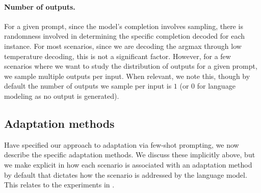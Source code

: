 \paragraph{Number of outputs.}
For a given prompt, since the model's completion involves sampling, there is randomness involved in determining the specific completion decoded for each instance. 
For most scenarios, since we are decoding the argmax through low temperature decoding, this is not a significant factor.
However, for a few scenarios where we want to study the distribution of outputs for a given prompt, we sample multiple outputs per input.
When relevant, we note this, though by default the number of outputs we sample per input is $1$ (or $0$ for language modeling as no output is generated).

\subsection{Adaptation methods}
\label{app:adaptation-methods}
Have specified our approach to adaptation via few-shot prompting, we now describe the specific adaptation methods. 
We discuss these implicitly above, but we make explicit in  how each scenario is associated with an adaptation method by default that dictates how the scenario is addressed by the language model.
This relates to the experiments in . 

